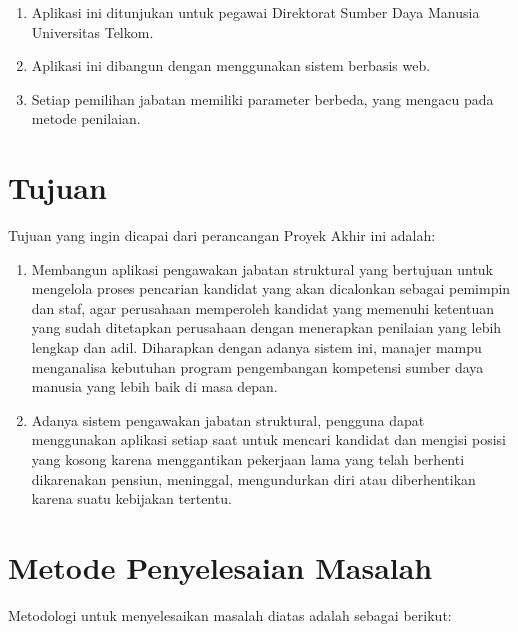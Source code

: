 \begin{enumerate}
	\item Aplikasi ini ditunjukan untuk pegawai Direktorat Sumber Daya Manusia Universitas Telkom.
	\item Aplikasi ini dibangun dengan menggunakan sistem berbasis web.
	\item Setiap pemilihan jabatan memiliki parameter berbeda, yang mengacu pada metode penilaian.
\end{enumerate}

\section{Tujuan}
Tujuan yang ingin dicapai dari perancangan Proyek Akhir ini adalah:

\begin{enumerate}
	\item Membangun aplikasi pengawakan jabatan struktural yang bertujuan untuk mengelola proses pencarian kandidat yang akan dicalonkan sebagai pemimpin dan staf, agar perusahaan memperoleh kandidat yang memenuhi ketentuan yang sudah ditetapkan perusahaan dengan menerapkan penilaian yang lebih lengkap dan adil. Diharapkan dengan adanya sistem ini, manajer mampu menganalisa kebutuhan program pengembangan kompetensi sumber daya manusia yang lebih baik di masa depan.
	
	\item Adanya sistem pengawakan jabatan struktural, pengguna dapat menggunakan aplikasi setiap saat untuk mencari kandidat dan mengisi posisi yang kosong karena menggantikan pekerjaan lama yang telah berhenti dikarenakan pensiun, meninggal, mengundurkan diri atau diberhentikan karena suatu kebijakan tertentu.
\end{enumerate}

\section{Metode Penyelesaian Masalah}
Metodologi untuk menyelesaikan masalah diatas adalah sebagai berikut:

